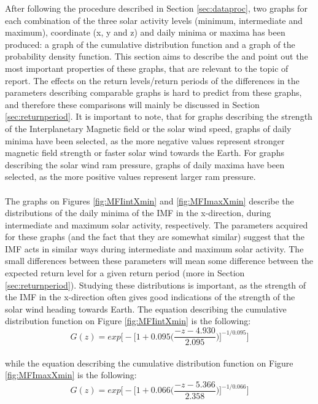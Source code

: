 \documentclass[11pt]{article}
\begin{document}
        After following the procedure described in Section \ref{sec:dataproc}, two graphs for each combination of the three solar activity levels (minimum, intermediate and maximum), coordinate (x, y and z) and daily minima or maxima has been produced: a graph of the cumulative distribution function and a graph of the probability density function. This section aims to describe the and point out the most important properties of these graphs, that are relevant to the topic of report. The effects on the return levels/return periods of the differences in the parameters describing comparable graphs is hard to predict from these graphs, and therefore these comparisons will mainly be discussed in Section \ref{sec:returnperiod}. It is important to note, that for graphs describing the strength of the Interplanetary Magnetic field or the solar wind speed, graphs of daily minima have been selected, as the more negative values represent stronger magnetic field strength or faster solar wind towards the Earth. For graphs describing the solar wind ram pressure, graphs of daily maxima have been selected, as the more positive values represent larger ram pressure.\\ \\
        The graphs on Figures \ref{fig:MFIintXmin} and \ref{fig:MFImaxXmin} describe the distributions of the daily minima of the IMF in the x-direction, during intermediate and maximum solar activity, respectively. The parameters acquired for these graphs (and the fact that they are somewhat similar) suggest that the IMF acts in similar ways during intermediate and maximum solar activity. The small differences between these parameters will mean some difference between the expected return level for a given return period (more in Section \ref{sec:returnperiod}). Studying these distributions is important, as the strength of the IMF in the x-direction often gives good indications of the strength of the solar wind heading towards Earth.
        The equation describing the cumulative distribution function on Figure \ref{fig:MFIintXmin} is the following:
        \begin{equation}
            G(z) = exp\Bigg [-\Bigg [1+0.095 \Bigg (\frac{-z-4.930}{2.095}\Bigg )\Bigg ]^{-1/0.095}\Bigg ]
        \end{equation}\\
        while the equation describing the cumulative distribution function on Figure \ref{fig:MFImaxXmin} is the following:
        \begin{equation}
            G(z) = exp\Bigg [-\Bigg [1+0.066 \Bigg (\frac{-z-5.366}{2.358}\Bigg )\Bigg ]^{-1/0.066}\Bigg ]
        \end{equation}\\ \\
\end{document}
